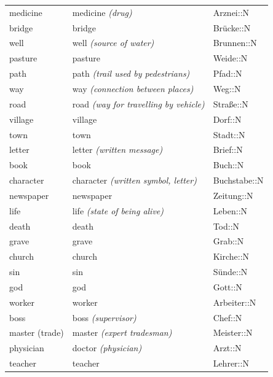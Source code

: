 \begin{center}
\begin{longtable}{lll}
{\sc \lowercase{	MEDICINE	}}	&	medicine	\textit{\footnotesize (drug)}	&	Arznei::N	\\
{\sc \lowercase{	BRIDGE	}}	&	bridge		&	Brücke::N	\\
{\sc \lowercase{	WELL	}}	&	well	\textit{\footnotesize (source of water)}	&	Brunnen::N	\\
{\sc \lowercase{	PASTURE	}}	&	pasture		&	Weide::N	\\
{\sc \lowercase{	PATH	}}	&	path	\textit{\footnotesize (trail used by pedestrians)}	&	Pfad::N	\\
{\sc \lowercase{	WAY	}}	&	way	\textit{\footnotesize (connection between places)}	&	Weg::N	\\
{\sc \lowercase{	ROAD	}}	&	road	\textit{\footnotesize (way for travelling by vehicle)}	&	Straße::N	\\
{\sc \lowercase{	VILLAGE	}}	&	village		&	Dorf::N	\\
{\sc \lowercase{	TOWN	}}	&	town		&	Stadt::N	\\
{\sc \lowercase{	LETTER	}}	&	letter	\textit{\footnotesize (written message)}	&	Brief::N	\\
{\sc \lowercase{	BOOK	}}	&	book		&	Buch::N	\\
{\sc \lowercase{	CHARACTER	}}	&	character	\textit{\footnotesize (written symbol, letter)}	&	Buchstabe::N	\\
{\sc \lowercase{	NEWSPAPER	}}	&	newspaper		&	Zeitung::N	\\
{\sc \lowercase{	LIFE	}}	&	life	\textit{\footnotesize (state of being alive)}	&	Leben::N	\\
{\sc \lowercase{	DEATH	}}	&	death		&	Tod::N	\\
{\sc \lowercase{	GRAVE	}}	&	grave		&	Grab::N	\\
{\sc \lowercase{	CHURCH	}}	&	church		&	Kirche::N	\\
{\sc \lowercase{	SIN	}}	&	sin		&	Sünde::N	\\
{\sc \lowercase{	GOD	}}	&	god		&	Gott::N	\\
{\sc \lowercase{	WORKER	}}	&	worker		&	Arbeiter::N	\\
{\sc \lowercase{	BOSS	}}	&	boss	\textit{\footnotesize (supervisor)}	&	Chef::N	\\
{\sc \lowercase{	MASTER \footnotesize (TRADE)	}}	&	master	\textit{\footnotesize (expert tradesman)}	&	Meister::N	\\
{\sc \lowercase{	PHYSICIAN	}}	&	doctor	\textit{\footnotesize (physician)}	&	Arzt::N	\\
{\sc \lowercase{	TEACHER	}}	&	teacher		&	Lehrer::N	\\

\end{longtable}
\end{center}

